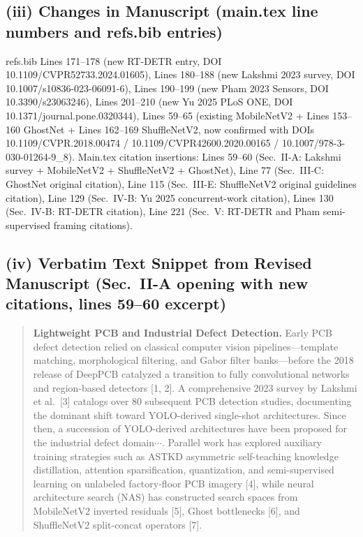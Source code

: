 \documentclass[conference]{IEEEtran}
\begin{document}
\subsection*{(iii) Changes in Manuscript (main.tex line numbers and refs.bib entries)}
refs.bib Lines 171--178 (new RT-DETR entry, DOI 10.1109/CVPR52733.2024.01605), Lines 180--188 (new Lakshmi 2023 survey, DOI 10.1007/s10836-023-06091-6), Lines 190--199 (new Pham 2023 Sensors, DOI 10.3390/s23063246), Lines 201--210 (new Yu 2025 PLoS ONE, DOI 10.1371/journal.pone.0320344), Lines 59--65 (existing MobileNetV2 + Lines 153--160 GhostNet + Lines 162--169 ShuffleNetV2, now confirmed with DOIs 10.1109/CVPR.2018.00474 / 10.1109/CVPR42600.2020.00165 / 10.1007/978-3-030-01264-9\_8). Main.tex citation insertions: Lines 59--60 (Sec.~II-A: Lakshmi survey + MobileNetV2 + ShuffleNetV2 + GhostNet), Line 77 (Sec.~III-C: GhostNet original citation), Line 115 (Sec.~III-E: ShuffleNetV2 original guidelines citation), Line 129 (Sec.~IV-B: Yu 2025 concurrent-work citation), Lines 130 (Sec.~IV-B: RT-DETR citation), Line 221 (Sec.~V: RT-DETR and Pham semi-supervised framing citations).

\subsection*{(iv) Verbatim Text Snippet from Revised Manuscript (Sec.~II-A opening with new citations, lines 59--60 excerpt)}
\begin{quote}
\textbf{Lightweight PCB and Industrial Defect Detection.}
Early PCB defect detection relied on classical computer vision pipelines---template matching, morphological filtering, and Gabor filter banks---before the 2018 release of DeepPCB catalyzed a transition to fully convolutional networks and region-based detectors [1, 2]. A comprehensive 2023 survey by Lakshmi et al.~[3] catalogs over 80 subsequent PCB detection studies, documenting the dominant shift toward YOLO-derived single-shot architectures. Since then, a succession of YOLO-derived architectures have been proposed for the industrial defect domain$\cdots$. Parallel work has explored auxiliary training strategies such as ASTKD asymmetric self-teaching knowledge distillation, attention sparsification, quantization, and semi-supervised learning on unlabeled factory-floor PCB imagery [4], while neural architecture search (NAS) has constructed search spaces from MobileNetV2 inverted residuals [5], Ghost bottlenecks [6], and ShuffleNetV2 split-concat operators [7].
\end{quote}
\end{document}
